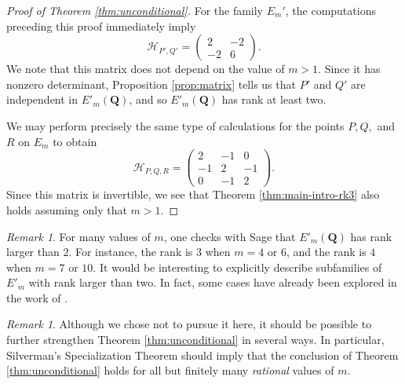 \documentclass{amsart}
\numberwithin{equation}{section}
\theoremstyle{remark}
\newtheorem{remark}[theorem]{Remark}
\newcommand{\Q}{\mathbf{Q}}
\begin{document}
\begin{proof}[Proof of Theorem \ref{thm:unconditional}]
For the family $E_m'$, the computations preceding this proof immediately imply
\[
\mathcal{H}_{P',Q'} = \left(
\begin{matrix}
2 & -2 \\
-2 & 6
\end{matrix}
\right).
\]
We note that this matrix does not depend on the value of $m>1$. Since it has nonzero determinant, Proposition \ref{prop:matrix} tells us that $P'$ and $Q'$ are independent in $E'_m(\Q)$, and so $E'_m(\Q)$ has rank at least two.

We may perform precisely the same type of calculations for the points $P,Q,$ and $R$ on $E_m$ to obtain
\[
\mathcal{H}_{P,Q,R} = \left(
\begin{matrix}
2 & -1 & 0\\
-1 & 2 & -1 \\
0 & -1 & 2
\end{matrix}
\right).
\]
Since this matrix is invertible, we see that Theorem \ref{thm:main-intro-rk3} also holds assuming only that $m>1$.
\end{proof}

\begin{remark}
For many values of $m$, one checks with Sage \cite{sage} that $E'_m(\Q)$ has rank larger than $2$. For instance, the rank is $3$ when $m=4$ or $6$, and the rank is $4$ when $m=7$ or $10$. It would be interesting to explicitly describe subfamilies of $E'_m$ with rank larger than two. In fact, some cases have already been explored in the work of \cite{tadic}.
\end{remark}


\begin{remark} Although we chose not to pursue it here, it should be possible to further strengthen Theorem \ref{thm:unconditional} in several ways. In particular, Silverman's Specialization Theorem should imply that the conclusion of Theorem \ref{thm:unconditional} holds for all but finitely many \textit{rational} values of $m$.
\end{remark}


\end{document}

